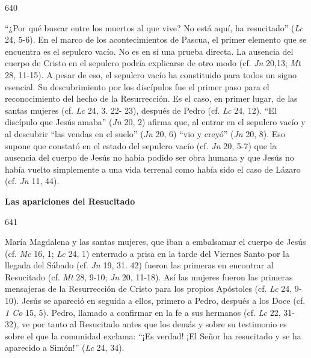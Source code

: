 			\begin{ccebody}\begin{ccenumber}640\end{ccenumber} “¿Por qué buscar entre los muertos al que vive? No está aquí, ha resucitado” (\textit{Lc} 24, 5-6). En el marco de los acontecimientos de Pascua, el primer elemento que se encuentra es el sepulcro vacío. No es en sí una prueba directa. La ausencia del cuerpo de Cristo en el sepulcro podría explicarse de otro modo (cf. \textit{Jn} 20,13; \textit{Mt} 28, 11-15). A pesar de eso, el sepulcro vacío ha constituido para todos un signo esencial. Su descubrimiento por los discípulos fue el primer paso para el reconocimiento del hecho de la Resurrección. Es el caso, en primer lugar, de las santas mujeres (cf. \textit{Lc} 24, 3. 22- 23), después de Pedro (cf. \textit{Lc} 24, 12). “El discípulo que Jesús amaba” (\textit{Jn} 20, 2) afirma que, al entrar en el sepulcro vacío y al descubrir “las vendas en el suelo” (\textit{Jn} 20, 6) “vio y creyó” (\textit{Jn} 20, 8). Eso supone que constató en el estado del sepulcro vacío (cf. \textit{Jn} 20, 5-7) que la ausencia del cuerpo de Jesús no había podido ser obra humana y que Jesús no había vuelto simplemente a una vida terrenal como había sido el caso de Lázaro (cf. \textit{Jn} 11, 44).\end{ccebody}
			
			\begin{ccebody}\textbf{Las apariciones del Resucitado}\end{ccebody}
			
			\begin{ccebody}\begin{ccenumber}641\end{ccenumber} María Magdalena y las santas mujeres, que iban a embalsamar el cuerpo de Jesús (cf. \textit{Mc} 16, 1; \textit{Lc} 24, 1) enterrado a prisa en la tarde del Viernes Santo por la llegada del Sábado (cf. \textit{Jn }19, 31. 42) fueron las primeras en encontrar al Resucitado (cf. \textit{Mt} 28, 9-10; \textit{Jn} 20, 11-18). Así las mujeres fueron las primeras mensajeras de la Resurrección de Cristo para los propios Apóstoles (cf. \textit{Lc} 24, 9-10). Jesús se apareció en seguida a ellos, primero a Pedro, después a los Doce (cf. \textit{1 Co} 15, 5). Pedro, llamado a confirmar en la fe a sus hermanos (cf. \textit{Lc} 22, 31-32), ve por tanto al Resucitado antes que los demás y sobre su testimonio es sobre el que la comunidad exclama: “¡Es verdad! ¡El Señor ha resucitado y se ha aparecido a Simón!” (\textit{Lc }24, 34).\end{ccebody}
			
